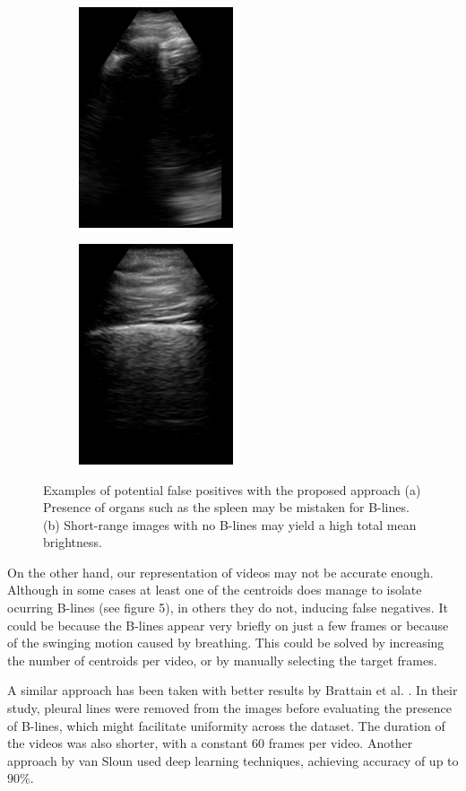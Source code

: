 \documentclass[11pt]{article} %
\begin{document}
	\begin{figure}[h]
	\centering
	\begin{subfigure}{0.4\textwidth}
	\centering
	\includegraphics[height=6.5cm]{figuras/spleen.jpg}
	\caption{}
	\end{subfigure}
	\begin{subfigure}{0.4\textwidth}
	\centering
	\includegraphics[height=6.5cm]{figuras/short_range.jpg}
	\caption{}
	\end{subfigure}
	\caption{Examples of potential false positives with the proposed approach (a) Presence of organs such as the spleen may be mistaken for B-lines. (b) Short-range images with no B-lines may yield a high total mean brightness.}
	\end{figure}
	
	On the other hand, our representation of videos may not be accurate enough. Although in some cases at least one of the centroids does manage to isolate ocurring B-lines (see figure 5), in others they do not, inducing false negatives. It could be because the B-lines appear very briefly on just a few frames or because of the swinging motion caused by breathing. This could be solved by increasing the number of centroids per video, or by manually selecting the target frames.
	
	A similar approach has been taken with better results by Brattain et al. \cite{brattain}. In their study, pleural lines were removed from the images before evaluating the presence of B-lines, which might facilitate uniformity across the dataset. The duration of the videos was also shorter, with a constant 60 frames per video. Another approach by van Sloun \cite{vanSloun} used deep learning techniques, achieving accuracy of up to $90 \%$.
	

	

\newpage
\newpage


\end{document}
